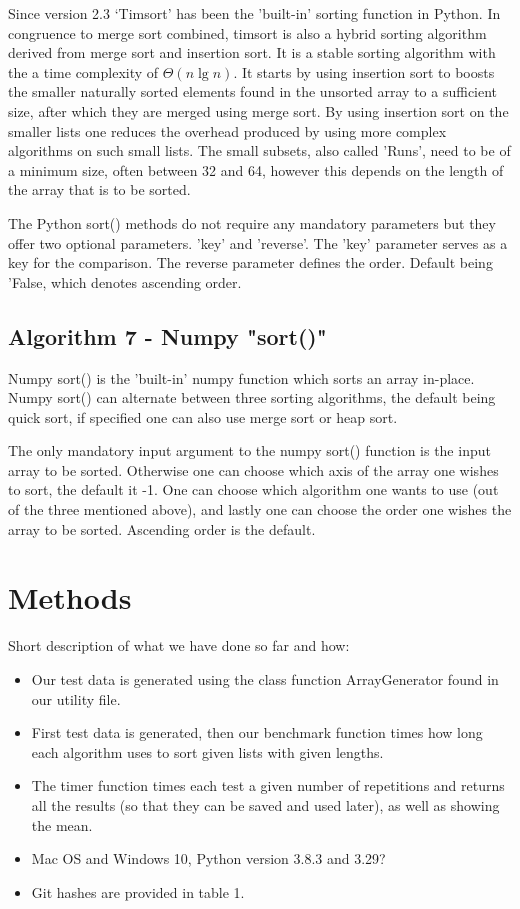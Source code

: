 \documentclass[sigconf, nonacm, natbib, screen, balance=False]{acmart}
\begin{document}
Since version 2.3 ‘Timsort’ has been the 'built-in' sorting function in Python. In congruence to merge sort combined, timsort is also a hybrid sorting algorithm derived from merge sort and insertion sort. 
It is a stable sorting algorithm with the a time complexity of $\Theta(n\lg n)$. It starts by using insertion sort to boosts the smaller naturally sorted elements found in the unsorted array to a sufficient size, after which they are merged using merge sort. By using insertion sort on the smaller lists one reduces the overhead produced by using more complex algorithms on such small lists. The small subsets, also called 'Runs', need to be of a minimum size, often between 32 and 64, however this depends on the length of the array that is to be sorted. 

The Python sort() methods do not require any mandatory parameters but they offer two optional parameters. 'key' and 'reverse'. The 'key' parameter serves as a key for the comparison. The reverse parameter defines the order. Default being 'False, which denotes ascending order.  

\subsection{Algorithm 7 - Numpy "sort()" }\label{sec:algo7}

Numpy sort() is the 'built-in' numpy function which sorts an array in-place. Numpy sort() can alternate between three sorting algorithms, the default being quick sort, if specified one can also use merge sort or heap sort. 

The only mandatory input argument to the numpy sort() function is the input array to be sorted. Otherwise one can choose which axis of the array one wishes to sort, the default it -1. One can choose which algorithm one wants to use (out of the three mentioned above), and lastly one can choose the order one wishes the array to be sorted. Ascending order is the default.

\section{Methods}\label{sec:methods}

Short description of what we have done so far and how:
\begin{itemize}
\item Our test data is generated using the class function ArrayGenerator found in our utility file.
\item First test data is generated, then our benchmark function times how long each algorithm uses to sort given lists with given lengths.  
\item The timer function times each test a given number of repetitions and returns all the results (so that they can be saved and used later), as well as showing the mean.
\item Mac OS and Windows 10, Python version 3.8.3 and 3.29?
\item Git hashes are provided in table 1.
\end{itemize}
\end{document}
